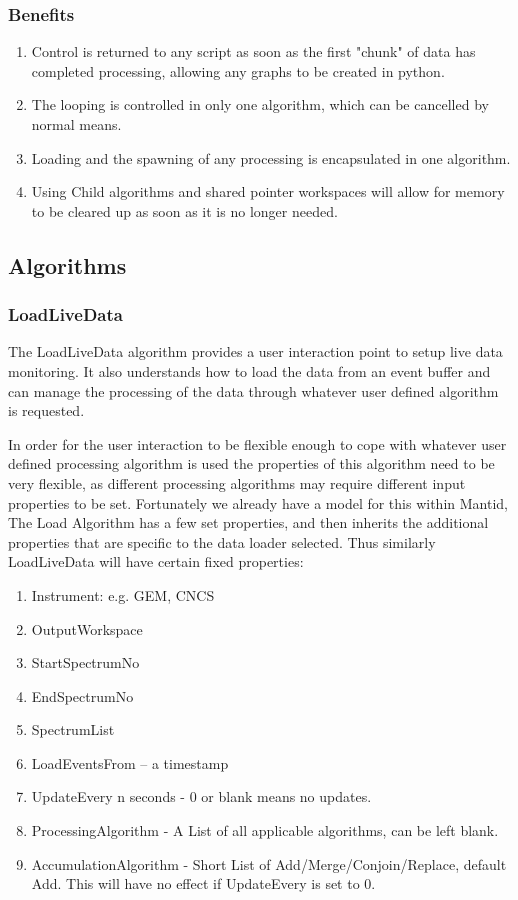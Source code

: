 \subsubsection{Benefits}

\begin{enumerate}
\item Control is returned to any script as soon as the first "chunk" of data has completed processing, allowing any graphs to be created in python.
\item The looping is controlled in only one algorithm, which can be cancelled by normal means.
\item Loading and the spawning of any processing is encapsulated in one algorithm.
\item Using Child algorithms and shared pointer workspaces will allow for memory to be cleared up as soon as it is no longer needed.
\end{enumerate}


\subsection{Algorithms}

\subsubsection{LoadLiveData}
The LoadLiveData algorithm provides a user interaction point to setup live data monitoring.  It also understands how to load the data from an event buffer and can manage the processing of the data through whatever user defined algorithm is requested.

In order for the user interaction to be flexible enough to cope with whatever user defined processing algorithm is used the properties of this algorithm need to be very flexible, as different processing algorithms may require different input properties to be set.  Fortunately we already have a model for this within Mantid, The Load Algorithm has a few set properties, and then inherits the additional properties that are specific to the data loader selected.  Thus similarly LoadLiveData will have certain fixed properties:

\begin{enumerate}
\item Instrument: e.g. GEM, CNCS
\item OutputWorkspace
\item StartSpectrumNo
\item EndSpectrumNo
\item SpectrumList
\item LoadEventsFrom – a timestamp
\item UpdateEvery n seconds - 0 or blank means no updates.
\item ProcessingAlgorithm - A List of all applicable algorithms, can be left blank.
\item AccumulationAlgorithm - Short List of Add/Merge/Conjoin/Replace, default Add.  This will have no effect if UpdateEvery is set to 0.
\end{enumerate}

